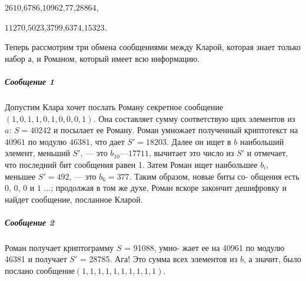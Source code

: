 \begin{center}
$2 610$,\;\;\;\;$6 786$,\;\;\;\;$10 962$,\;\;\;\;$77$,\;\;\;\;$28 864$,

$11 270$,\;\;\;\;$5 023$,\;\;\;\;$3 799$,\;\;\;\;$6 374$,\;\;\;\;$15 323$.
\end{center}
\noindent Теперь рассмотрим три обмена сообщениями между Кларой, которая\linebreak
знает только набор $а$, и Романом, который имеет всю информацию.
\pagebreak
\subparagraph{Сообщение 1}
Допустим Клара хочет послать Роману секретное\linebreak
сообщение $(1,0,1,1,0,1,0,0,0,1)$. Она составляет сумму соответствую­\linebreak
щих элементов из $a$: $S = 40 242$ и посылает ее Роману.\linebreak
Роман умножает полученный криптотекст на $40961$ по модулю\linebreak
$46381$, что дает $S' = 18203$. Далее он ищет в $b$ наибольший элемент,\linebreak
меньший $S'$, — это $b_10 — 17711$, вычитает это число из $S'$ и отмечает,\linebreak
что последний бит сообщения равен 1. Затем Роман ищет наибольшее\linebreak
$b_i$, меньшее $S' = 492$, — это $b_6 = 377$. Таким образом, новые биты со­-\linebreak
общения есть $0$, $0$, $0$ и $1$ ...; продолжая в том же духе, Роман вскоре\linebreak
закончит дешифровку и найдет сообщение, посланное Кларой.

\subparagraph{Сообщение 2}
Роман получает криптограмму $S$ = 91088, умно­-\linebreak
жает ее на 40961 по модулю 46381 и получает $S'$ = 28785. Ага!\linebreak
Это сумма всех элементов из $b$, а значит, было послано сообщение\linebreak$
(1,1,1,1,1,1,1,1,1,1)$.

